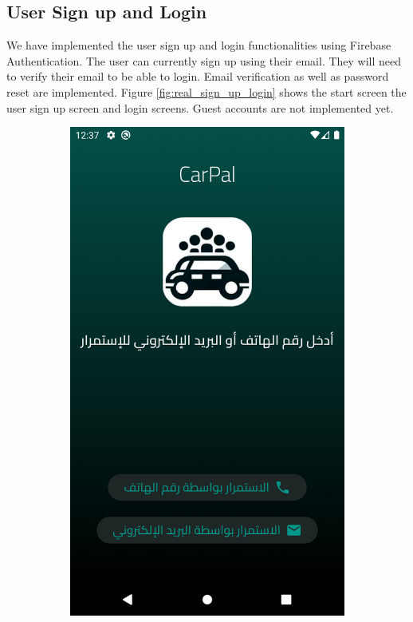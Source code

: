 \documentclass[a4paper, 12pt]{report} %
\begin{document}
        \subsection{User Sign up and Login}
            We have implemented the user sign up and login functionalities using Firebase Authentication. The user can currently sign up using their email. They will need to verify their email to be able to login. Email verification as well as password reset are implemented. Figure \ref{fig:real_sign_up_login} shows the start screen the user sign up screen and login screens. Guest accounts are not implemented yet. 
            \begin{figure}[H]
                \centering
                \begin{subfigure}{0.3\textwidth}
                    \includegraphics[width=0.8\linewidth, height=0.9\textheight, keepaspectratio]{Images/first_screen.png}

\end{subfigure}
\end{figure}
\end{document}
